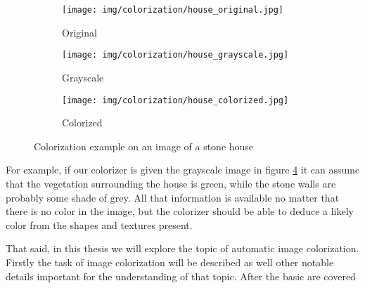 \begin{figure}[ht!]
	\centering
	\begin{subfigure}{.32\textwidth}
		\centering
		\texttt{[image: img/colorization/house\_original.jpg]}
        \caption{Original}
		\label{fig:stone_house:original}
	\end{subfigure}
    \begin{subfigure}{.32\textwidth}
		\centering
		\texttt{[image: img/colorization/house\_grayscale.jpg]}
        \caption{Grayscale}
        \label{fig:stone_house:grayscale}
    \end{subfigure}
	\begin{subfigure}{.32\textwidth}
		\centering
		\texttt{[image: img/colorization/house\_colorized.jpg]}
        \caption{Colorized}
        \label{fig:stone_house:colorized}
    \end{subfigure}
    \caption{Colorization example on an image of a stone house}
	\label{fig:stone_house}
\end{figure}

For example, if our colorizer is given the grayscale image in figure 
\ref{fig:stone_house} it can assume that the vegetation surrounding the 
house is green, while the stone walls are probably some shade of grey. 
All that information is available no matter that there is no color 
in the image, but the colorizer should be able to deduce a likely color from the 
shapes and textures present. 

That said, in this thesis we will explore the topic of automatic image 
colorization. Firstly the task of image colorization will be described as well 
other notable details important for the understanding of that topic. After the
basic are covered 

\begin{comment}

\textbf{TODO!}


- Technicalities 
- The task of colorization
- Different approaches to image colorization
- Dataset
- Problems with colorization
- Different metrics for assesing the models
- Ground up explinations of the working and training of different models
\end{comment}